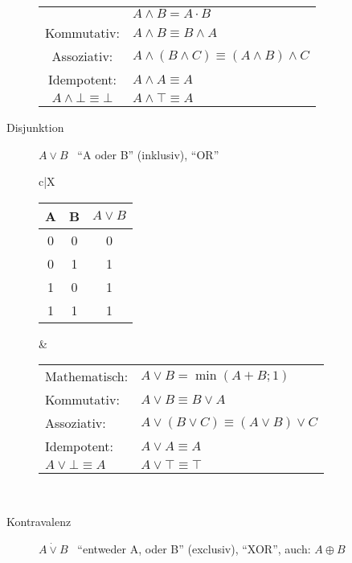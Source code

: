 \begin{description}
\begin{description}
\begin{tabularx}{\linewidth}{c|X}
\begin{tabular}[t]{ll}
                Mathematisch:               & $A \wedge B = A \cdot B$                             \\
                Kommutativ:                 & $A \wedge B \equiv B \wedge A$                       \\
                Assoziativ:                 & $A \wedge (B \wedge C) \equiv (A \wedge B) \wedge C$ \\
                Idempotent:                 & $A \wedge A \equiv A$                                \\
                $A \wedge \bot \equiv \bot$ & $A \wedge \top \equiv A$
            \end{tabular} \\ \hline
        \end{tabularx}
        \item[Disjunktion] $A\vee B$ \, ``A oder B'' (inklusiv), ``OR'' \\
        \begin{tabularx}{\linewidth}{c|X}
            \begin{tabular}[t]{c|c||c}
                A & B & $A \vee B$ \\ \hline\hline
                0 & 0 & 0          \\ \hline
                0 & 1 & 1          \\ \hline
                1 & 0 & 1          \\ \hline
                1 & 1 & 1
            \end{tabular} &
            \begin{tabular}[t]{ll}
                Mathematisch:           & $A \vee B = \min(A+B;1)$                     \\
                Kommutativ:             & $A \vee B \equiv B \vee A$                   \\
                Assoziativ:             & $A \vee (B \vee C) \equiv (A \vee B) \vee C$ \\
                Idempotent:             & $A \vee A \equiv A$                          \\
                $A \vee \bot \equiv A $ & $A \vee \top \equiv \top$
            \end{tabular} \\ \hline
        \end{tabularx}
        \item[Kontravalenz] $A\dot{\vee}B$ \, ``entweder A, oder B'' (exclusiv), ``XOR'', auch: $A\oplus B$ \\

\end{description}
\end{description}
